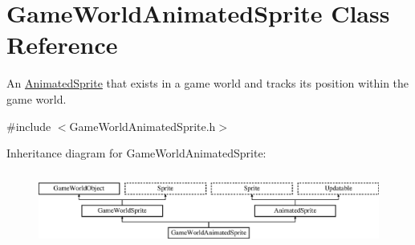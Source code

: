 \hypertarget{class_game_world_animated_sprite}{}\section{Game\+World\+Animated\+Sprite Class Reference}
\label{class_game_world_animated_sprite}


An \hyperlink{class_animated_sprite}{Animated\+Sprite} that exists in a game world and tracks its position within the game world.  




{\ttfamily \#include $<$Game\+World\+Animated\+Sprite.\+h$>$}

Inheritance diagram for Game\+World\+Animated\+Sprite\+:\begin{figure}[H]
\begin{center}
\leavevmode
\includegraphics[height=2.470588cm]{class_game_world_animated_sprite}
\end{center}
\end{figure}
